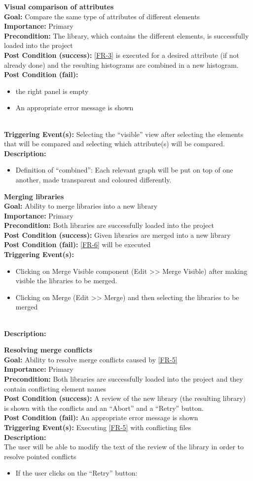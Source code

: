 \documentclass[10pt,a4paper]{report}
\newcommand{\precondition}[1]{
    \textbf{Precondition: } #1 \leavevmode \\
}
\newcommand{\FRDescription}[8]{
    \textbf{#1} \leavevmode \\
    \textbf{Goal: } #2 \leavevmode \\
    \textbf{Importance: } #3 \leavevmode \\
    \precondition{#4}
    \textbf{Post Condition (success): } #5 \leavevmode \\
    \textbf{Post Condition (fail): } #6 \leavevmode \\
    \textbf{Triggering Event(s): } #7 \leavevmode \\
    \textbf{Description: } \leavevmode \\ 
    #8}
\begin{document}
\begin{FR}
    \item \FRDescription{Visual comparison of attributes}
    {Compare the same type of attributes of different elements}
    {Primary}
    {The library, which contains the different elements,  is successfully loaded into the project}
    {\ref{FR-3} is executed for a desired attribute (if not already done) and the resulting histograms are combined in a new histogram.}
    {
    \begin{itemize}
        \item the right panel is empty
        \item An appropriate error message is shown
    \end{itemize}
    }
    {Selecting the “visible” view after selecting the elements that will be compared and selecting which attribute(s) will be compared.}
    {\begin{itemize}
        \item Definition of “combined”: Each relevant graph will be put on top of one another, made transparent and coloured differently.
    \end{itemize}}
    \item \FRDescription{Merging libraries}
    {Ability to merge libraries into a new library}
    {Primary}
    {Both libraries are successfully loaded into the project}
    {Given libraries are merged into a new library}
    {\ref{FR-6} will be executed}
    {\begin{itemize}
        \item Clicking on Merge Visible component (Edit >> Merge Visible) after making visible the libraries to be merged.
        \item Clicking on Merge (Edit >> Merge) and then selecting the libraries to be merged
    \end{itemize}}
    \item \FRDescription{Resolving merge conflicts}
    {Ability to resolve merge conflicts caused by \ref{FR-5}}
    {Primary}
    {Both libraries are successfully loaded into the project and they contain conflicting element names}
    {A review of the new library (the resulting library) is shown with the conflicts and an “Abort” and a “Retry” button.}
    {An appropriate error message is shown}
    {Executing \ref{FR-5} with conflicting files}
    {The user will be able to modify the text of the review of the library in order to resolve pointed conflicts
    \begin{itemize}
        \item If the user clicks on the “Retry” button:

\end{itemize}}
\end{FR}
\end{document}
